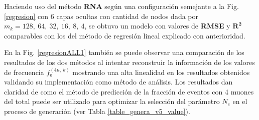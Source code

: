 Haciendo uso del método \textbf{RNA} según una configuración semejante a la Fig. \ref{regresion} con $6$ capas ocultas con cantidad de nodos dada por $m_k=128,~64,~32,~16,~8,~4$, se obtuvo un modelo con valores de \textbf{RMSE} y $\mathbf{R^2}$ comparables con los del método de regresión lineal explicado con anterioridad.

En la Fig. \ref{regresionALL1} también se puede observar una comparación de los resultados de los dos métodos al intentar reconstruir la información de los valores de frecuencia $f^{(4\mu,~k)}_\textsf{e}$ mostrando una alta linealidad en los resultados obtenidos validando su implementación como método de análisis. Los resultados dan claridad de como el método de predicción de la fracción de eventos con 4 muones del total puede ser utilizado para optimizar la selección del parámetro $N_e$ en el proceso de generación (ver Tabla \ref{table_genera_v5_value}).


%



